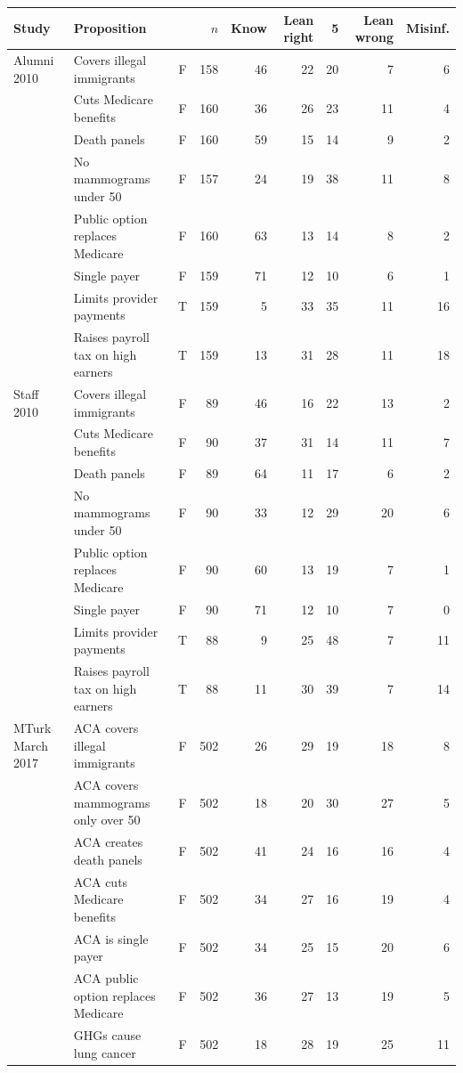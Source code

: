 \begin{tabular}{llcrrrrrr}
\toprule
Study & Proposition &  & $n$ & Know & Lean right & 5 & Lean wrong & Misinf. \\
\midrule
Alumni 2010 & Covers illegal immigrants & F & 158 & 46 & 22 & 20 & 7 & 6 \\
 & Cuts Medicare benefits & F & 160 & 36 & 26 & 23 & 11 & 4 \\
 & Death panels & F & 160 & 59 & 15 & 14 & 9 & 2 \\
 & No mammograms under 50 & F & 157 & 24 & 19 & 38 & 11 & 8 \\
 & Public option replaces Medicare & F & 160 & 63 & 13 & 14 & 8 & 2 \\
 & Single payer & F & 159 & 71 & 12 & 10 & 6 & 1 \\
 & Limits provider payments & T & 159 & 5 & 33 & 35 & 11 & 16 \\
 & Raises payroll tax on high earners & T & 159 & 13 & 31 & 28 & 11 & 18 \\
Staff 2010 & Covers illegal immigrants & F &  89 & 46 & 16 & 22 & 13 & 2 \\
 & Cuts Medicare benefits & F &  90 & 37 & 31 & 14 & 11 & 7 \\
 & Death panels & F &  89 & 64 & 11 & 17 & 6 & 2 \\
 & No mammograms under 50 & F &  90 & 33 & 12 & 29 & 20 & 6 \\
 & Public option replaces Medicare & F &  90 & 60 & 13 & 19 & 7 & 1 \\
 & Single payer & F &  90 & 71 & 12 & 10 & 7 & 0 \\
 & Limits provider payments & T &  88 & 9 & 25 & 48 & 7 & 11 \\
 & Raises payroll tax on high earners & T &  88 & 11 & 30 & 39 & 7 & 14 \\
MTurk March 2017 & ACA covers illegal immigrants & F & 502 & 26 & 29 & 19 & 18 & 8 \\
 & ACA covers mammograms only over 50 & F & 502 & 18 & 20 & 30 & 27 & 5 \\
 & ACA creates death panels & F & 502 & 41 & 24 & 16 & 16 & 4 \\
 & ACA cuts Medicare benefits & F & 502 & 34 & 27 & 16 & 19 & 4 \\
 & ACA is single payer & F & 502 & 34 & 25 & 15 & 20 & 6 \\
 & ACA public option replaces Medicare & F & 502 & 36 & 27 & 13 & 19 & 5 \\
 & GHGs cause lung cancer & F & 502 & 18 & 28 & 19 & 25 & 11 \\

\end{tabular}
